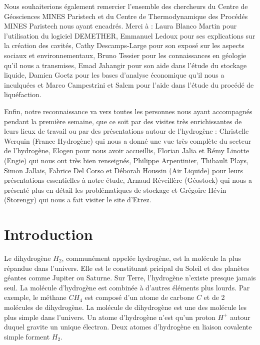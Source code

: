 \documentclass[11pt,french,a4paper]{article}
\makeatletter
\newcommand\mainmatter{%

  \pagenumbering{arabic}}
\makeatother
\begin{document}
Nous souhaiterions également remercier l’ensemble des chercheurs du Centre de Géosciences MINES Paristech et du Centre de Thermodynamique des Procédés MINES Paristech nous ayant encadrés. Merci à : Laura Blanco Martin pour l’utilisation du logiciel DEMETHER, Emmanuel Ledoux pour ses explications sur la création des cavités, Cathy Descamps-Large pour son exposé sur les aspects sociaux et environnementaux, Bruno Tessier pour les connaissances en géologie qu’il nous a transmises, Emad Jahangir pour son aide dans l’étude du stockage liquide, Damien Goetz pour les bases d’analyse économique qu’il nous a inculquées et Marco Campestrini  et Salem pour l’aide dans l’étude du procédé de liquéfaction.

Enfin, notre reconnaissance va vers toutes les personnes nous ayant accompagnés pendant la première semaine, que ce soit par des visites très enrichissantes de leurs lieux de travail ou par des présentations autour de l’hydrogène : Christelle Werquin (France Hydrogène) qui nous a donné une vue très complète du secteur de l’hydrogène, Elogen pour nous avoir accueillis, Florian Jalia et Rémy Linotte (Engie) qui nous ont très bien renseignés, Philippe Arpentinier, Thibault Plays, Simon Jallais, Fabrice Del Corso et Déborah Houssin (Air Liquide) pour leurs présentations essentielles à notre étude,  Arnaud Réveillère (Géostock) qui nous a présenté plus en détail les problématiques de stockage et Grégoire Hévin (Storengy) qui nous a fait visiter le site d’Etrez.






\newpage
\tableofcontents

\newpage
















\mainmatter

\section*{Introduction} 

Le dihydrogène $H_2$, communément appelée hydrogène, est la molécule la plus répandue dans l'univers. Elle est le constituant pricipal du Soleil et des planètes géantes comme Jupiter ou Saturne. Sur Terre, l'hydrogène n'existe presque jamais seul. La molécule d'hydrogène est combinée à d'autres éléments plus lourds. Par exemple, le méthane $CH_4$ est composé d'un atome de carbone $C$ et de 2 molécules de dihydrogène. La molécule de dihydrogène est une des molécule les plus simple dans l'univers. Un atome d'hydrogène n'est qu'un proton $H^+$ autour duquel gravite un unique électron. Deux atomes d'hydrogène en liaison covalente simple forment $H_2$.\\
\end{document}
